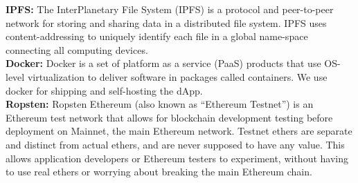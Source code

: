 \noindent
\textbf{IPFS: } The InterPlanetary File System (IPFS) is a protocol and peer-to-peer network for storing and sharing data in a distributed file system. IPFS uses content-addressing to uniquely identify each file in a global name-space connecting all computing devices. \\[-8pt]

\noindent
\textbf{Docker: } Docker is a set of platform as a service (PaaS) products that use OS-level virtualization to deliver software in packages called containers. We use docker for shipping and self-hosting the dApp. \\[-8pt]

\noindent
\textbf{Ropsten: } Ropsten Ethereum (also known as ``Ethereum Testnet'') is an Ethereum test network that allows for blockchain development testing before deployment on Mainnet, the main Ethereum network. Testnet ethers are separate and distinct from actual ethers, and are never supposed to have any value. This allows application developers or Ethereum testers to experiment, without having to use real ethers or worrying about breaking the main Ethereum chain. \\[-8pt]
